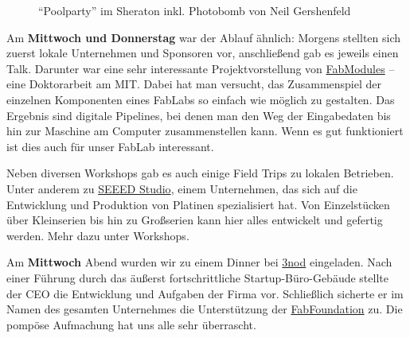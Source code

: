 \documentclass{\basedir/fablab-document}
\begin{document}
\begin{figure}[h]
	\noindent{}
	\caption{``Poolparty'' im Sheraton inkl. Photobomb von Neil Gershenfeld}
	\label{photobomb-neil}
\end{figure}

Am \textbf{Mittwoch und Donnerstag} war der Ablauf ähnlich: Morgens
stellten sich zuerst lokale Unternehmen und Sponsoren vor, anschließend
gab es jeweils einen Talk. Darunter war eine sehr interessante
Projektvorstellung von \href{http://fabmodules.org/}{FabModules} -- eine
Doktorarbeit am MIT. Dabei hat man versucht, das Zusammenspiel der
einzelnen Komponenten eines FabLabs so einfach wie möglich zu gestalten.
Das Ergebnis sind digitale Pipelines, bei denen man den Weg der
Eingabedaten bis hin zur Maschine am Computer zusammenstellen kann. Wenn
es gut funktioniert ist dies auch für unser FabLab interessant.

Neben diversen Workshops gab es auch einige Field Trips zu lokalen
Betrieben. Unter anderem zu \href{https://www.seeedstudio.com/}{SEEED
Studio}, einem Unternehmen, das sich auf die Entwicklung und Produktion
von Platinen spezialisiert hat. Von Einzelstücken über Kleinserien bis
hin zu Großserien kann hier alles entwickelt und gefertig werden. Mehr
dazu unter Workshops.

Am \textbf{Mittwoch} Abend wurden wir zu einem Dinner bei
\href{https://www.3nod.com.cn/en/}{3nod} eingeladen. Nach einer
Führung durch das äußerst fortschrittliche Startup-Büro-Gebäude stellte
der CEO die Entwicklung und Aufgaben der Firma vor.
Schließlich sicherte er im Namen des gesamten Unternehmes die
Unterstützung der \href{https://fabfoundation.org/}{FabFoundation} zu.
Die pompöse Aufmachung hat uns alle sehr überrascht.
\end{document}
